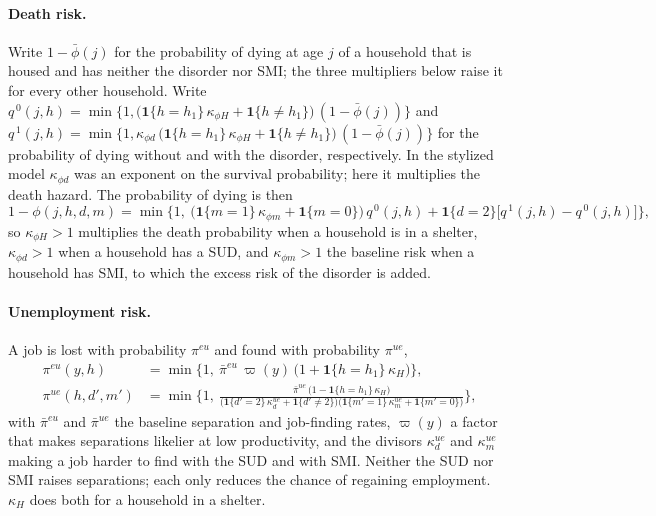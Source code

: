 \documentclass[10pt]{article}
\begin{document}
\paragraph{Death risk.}\label{sec:fdeath} Write $1-\bar\phi(j)$ for the probability of dying
at age $j$ of a household that is housed and has neither the disorder nor SMI; the three
multipliers below raise it for every other household. Write
$q^{\,0}(j,h)=\min\{1,\big(\mathbf{1}\{h=h_1\}\,\kappa_{\phi H}+\mathbf{1}\{h\neq h_1\}\big)\,(1-\bar\phi(j))\}$ and
$q^{\,1}(j,h)=\min\{1,\kappa_{\phi d}\,\big(\mathbf{1}\{h=h_1\}\,\kappa_{\phi H}+\mathbf{1}\{h\neq h_1\}\big)\,(1-\bar\phi(j))\}$
for the probability of dying without and with the disorder, respectively. In the stylized model $\kappa_{\phi d}$ was an exponent on the survival probability; here it multiplies the death hazard. The probability of dying is then
\begin{equation}\label{eq:fsurv}
1-\phi(j,h,d,m)=\min\Big\{1,\ \big(\mathbf{1}\{m=1\}\,\kappa_{\phi m}+\mathbf{1}\{m=0\}\big)\,q^{\,0}(j,h)
+\mathbf{1}\{d=2\}\big[q^{\,1}(j,h)-q^{\,0}(j,h)\big]\Big\},
\end{equation}
so $\kappa_{\phi H}{}>1$ multiplies the death probability when a household is in a shelter, $\kappa_{\phi d}{}>1$ when a household has a SUD, and $\kappa_{\phi m}>1$ the baseline risk when a household has SMI, to which the excess risk of the disorder is
added.

\paragraph{Unemployment risk.} A job is lost with probability $\pi^{eu}$ and found
with probability $\pi^{ue}$,
\begin{equation}\label{eq:femp}
\begin{aligned}
\pi^{eu}(y,h)&=\min\Big\{1,\ \bar\pi^{eu}\,\varpi(y)\,
\big(1+\mathbf{1}\{h=h_1\}\,\kappa_{H}\big)\Big\},\\
\pi^{ue}(h,d',m')&=\min\Big\{1,\ \frac{\bar\pi^{ue}\,\big(1-\mathbf{1}\{h=h_1\}\,\kappa_{H}\big)}
{\big(\mathbf{1}\{d'=2\}\,\kappa^{ue}_{d}+\mathbf{1}\{d'\neq2\}\big)\big(\mathbf{1}\{m'=1\}\,\kappa^{ue}_{m}+\mathbf{1}\{m'=0\}\big)}\Big\},
\end{aligned}
\end{equation}
with $\bar\pi^{eu}$ and $\bar\pi^{ue}$ the baseline separation and job-finding rates,
$\varpi(y)$ a factor that makes separations likelier at low productivity, and the divisors
$\kappa^{ue}_{d}$ and $\kappa^{ue}_{m}$ making a job harder to find with the SUD and with
SMI. Neither the SUD nor SMI raises separations; each only reduces the chance of regaining employment. $\kappa_{H}$ does both for a household in a
shelter.
\end{document}
